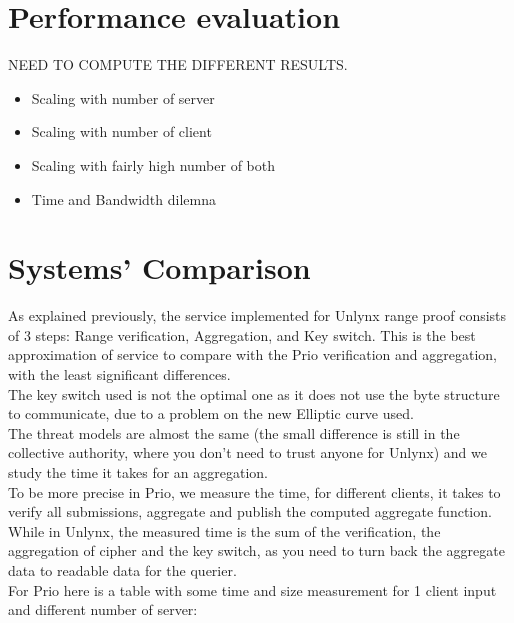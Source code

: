 \documentclass{article}
\begin{document}
\section{Performance evaluation}

NEED TO COMPUTE THE DIFFERENT RESULTS.

\begin{itemize}


\item Scaling with number of server
\item Scaling with number of client
\item Scaling with fairly high number of both 
\item Time and Bandwidth dilemna

\end{itemize}


\section{Systems' Comparison}
As explained previously, the service implemented for Unlynx range proof consists of 3 steps: Range verification, Aggregation, and Key switch. This is the best approximation of service to compare with the Prio verification and aggregation, with the least significant differences.\\
The key switch used is not the optimal one as it does not use the byte structure to communicate, due to a problem on the new Elliptic curve used.\\

The threat models are almost the same (the small difference is still in the collective authority, where you don't need to trust anyone for Unlynx) and we study the time it takes for an aggregation.\\
To be more precise in Prio, we measure the time, for different clients, it takes to verify all submissions, aggregate and publish the computed aggregate function.
While in Unlynx, the measured time is the sum of the verification, the aggregation of cipher and the key switch, as you need to turn back the aggregate data to readable data for the querier.\\

For Prio here is a table with some time and size measurement for 1 client input and different number of server:\\
\end{document}

